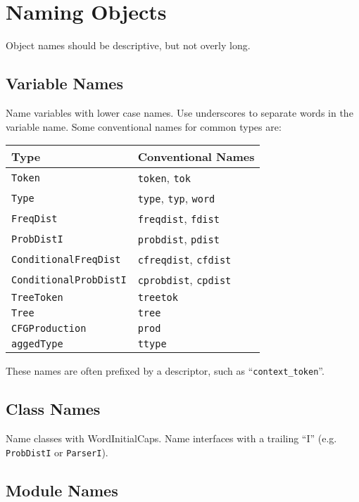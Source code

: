 \documentclass{article}
\begin{document}
\section{Naming Objects}

Object names should be descriptive, but not overly long.

\subsection{Variable Names}

Name variables with lower case names.  Use underscores to separate
words in the variable name.  Some conventional names for common types
are:

\begin{tabular}{l|l}
Type & Conventional Names \\
\hline
\texttt{Token} & \texttt{token}, \texttt{tok}\\
\texttt{Type} & \texttt{type}, \texttt{typ}, \texttt{word}\\
\texttt{FreqDist} & \texttt{freqdist}, \texttt{fdist}\\
\texttt{ProbDistI} & \texttt{probdist}, \texttt{pdist}\\
\texttt{ConditionalFreqDist} & \texttt{cfreqdist}, \texttt{cfdist}\\
\texttt{ConditionalProbDistI} & \texttt{cprobdist}, \texttt{cpdist}\\
\texttt{TreeToken} & \texttt{treetok}\\
\texttt{Tree} & \texttt{tree}\\
\texttt{CFGProduction} & \texttt{prod}\\
\texttt{aggedType} & \texttt{ttype}\\
\end{tabular}

These names are often prefixed by a descriptor, such as
``\texttt{context\_token}''.

\subsection{Class Names}

Name classes with WordInitialCaps.  Name interfaces with a trailing
``I'' (e.g. \texttt{ProbDistI} or \texttt{ParserI}).

\subsection{Module Names}
\end{document}
